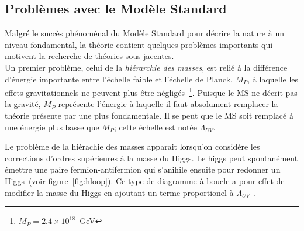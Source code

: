 



\subsection{Problèmes avec le Modèle Standard}
\label{sec:ms:problemes}

Malgré le succès phénoménal du Modèle Standard pour décrire la nature
à un niveau fondamental, la théorie contient quelques problèmes
importants qui motivent la recherche de théories sous-jacentes. \\

Un premier problème, celui de la \emph{hiérarchie des masses}, est
relié à la différence d'énergie importante entre l'échelle faible et
l'échelle de Planck, $M_P$, à laquelle les effets gravitationnels ne
peuvent plus être négligés~\footnote{$M_P = 2.4 \times 10^{18}$~GeV}. Puisque le MS ne décrit pas la gravité,
$M_P$ représente l'énergie à laquelle il faut absolument remplacer la
théorie présente par une plus fondamentale. Il se peut que le MS soit
remplacé à une énergie plus basse que $M_P$; cette échelle est notée $\Lambda_{UV}$.

Le problème de la hiérachie des masses apparait lorsqu'on considère
les corrections d'ordres supérieures à la masse du Higgs. Le higgs peut
spontanément émettre une paire fermion-antifermion qui s'anihile
ensuite pour redonner un Higgs~(voir figure~\ref{fig:hloop}). Ce type de diagramme à boucle a pour
effet de modifier la masse du Higgs en ajoutant un terme proportionel
à $\Lambda_{UV}$~\cite{martin_supersymmetry_1997}.

